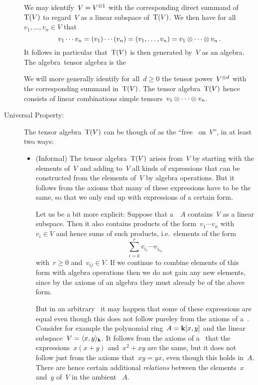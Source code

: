 \begin{recall}
\begin{description}
      We may identify~$V = V^{\otimes 1}$ with the corresponding direct summand of~$\operatorname{T}(V)$ to regard~$V$ as a linear subspace of~$\operatorname{T}(V)$.
      We then have for all~$v_1, \dotsc, v_n \in V$ that
      \[
        v_1 \dotsm v_n
        =
        (v_1) \dotsm (v_n)
        =
        (v_1, \dotsc, v_n)
        =
        v_1 \otimes \dotsb \otimes v_n  \,.
      \]
      It follows in particular that~$\operatorname{T}(V)$ is then generated by~$V$ as an algebra.
      The algebra~\gls*{tensor algebra} is the 
      
      We will more generally identify for all~$d \geq 0$ the tensor power~$V^{\otimes d}$ with the corresponding summand in~$\operatorname{T}(V)$.
      The tensor algebra~$\operatorname{T}(V)$ hence consists of linear combinations simple tensors~$v_1 \otimes \dotsb \otimes v_n$.
    
    \item[Universal Property:]
      The tensor algebra~$\operatorname{T}(V)$ can be though of as the \enquote{free~{\algebra{$\kf$}} on~$V$}, in at least two ways:
      \begin{itemize}
        \item(Informal)
          The tensor algebra~$\operatorname{T}(V)$ arises from~$V$ by starting with the elements of~$V$ and adding to~$V$ all kinds of expressions that can be constructed from the elements of~$V$ by algebra operations.
          But it follows from the axioms that many of these expressions have to be the same, so that we only end up with expressions of a certain form.
          
          Let us be a bit more explicit:
          Suppose that a~{\algebra{$\kf$}}~$A$ contains~$V$ as a linear subspace.
          Then it also contains products of the form~$v_1 \dotsm v_n$ with~$v_i \in V$ and hence sums of such products, i.e.\ elements of the form
          \[
            \sum_{i=k}^r v_{i_1} \dotsm v_{i_{n_k}}
          \]
          with~$r \geq 0$ and~$v_{ij} \in V$.
          If we continue to combine elements of this form with algebra operations then we do not gain any new elements, since by the axioms of an algebra they must already be of the above form.
          
          But in an arbitrary~{\algebra{$\kf$}} it may happen that some of these expressions are equal even though this does not follow pureley from the axioms of a~{\algebra{$\kf$}}.
          Consider for example the polynomial ring~$A = \mathbf{k}[x, y]$ and the linear subspace~$V = \langle x, y\rangle_{\mathbf{k}}$.
          It follows from the axioms of a~{\algebra{$\kf$}} that the expressions~$x (x+y)$ and~$x^2 + xy$ are the same, but it does not follow just from the axioms that~$xy = yx$, even though this holds in~$A$.
          There are hence certain additional \emph{relations} between the elements~$x$ and~$y$ of~$V$ in the ambient {\algebra{$\kf$}}~$A$.
          

\end{itemize}
\end{description}
\end{recall}
